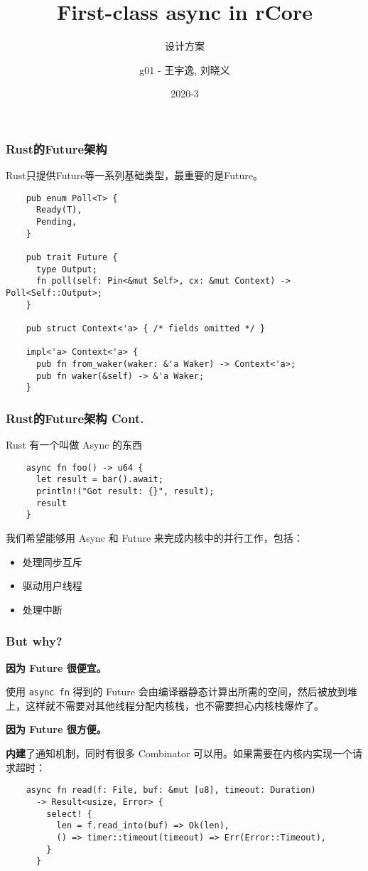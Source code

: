 \documentclass[UTF-8]{ctexbeamer}
\title{First-class async in rCore}
\subtitle{设计方案}
\author{g01 - 王宇逸, 刘晓义}
\date{2020-3}
\begin{document}
\begin{frame}
  \titlepage
\end{frame}

\begin{frame}[fragile]
  \frametitle{Rust的Future架构}

  Rust只提供Future等一系列基础类型，最重要的是Future。
  {
  \scriptsize
  \begin{verbatim}
    pub enum Poll<T> {
      Ready(T),
      Pending,
    }

    pub trait Future {
      type Output;
      fn poll(self: Pin<&mut Self>, cx: &mut Context) -> Poll<Self::Output>;
    }

    pub struct Context<'a> { /* fields omitted */ }

    impl<'a> Context<'a> {
      pub fn from_waker(waker: &'a Waker) -> Context<'a>;
      pub fn waker(&self) -> &'a Waker;
    }
  \end{verbatim}
  }
\end{frame}

\begin{frame}[fragile]
  \frametitle{Rust的Future架构 Cont.}

  Rust 有一个叫做 Async 的东西

  \begin{verbatim}
    async fn foo() -> u64 {
      let result = bar().await;
      println!("Got result: {}", result);
      result
    }
  \end{verbatim}

  \vspace{1em}

  我们希望能够用 Async 和 Future 来完成内核中的并行工作，包括：
  \begin{itemize}
    \item 处理同步互斥
    \item 驱动用户线程
    \item 处理中断
  \end{itemize}
\end{frame}

\begin{frame}[fragile]
  \frametitle{But why?}

  \textbf{因为 Future 很便宜。}

  使用 \texttt{async fn} 得到的 Future 会由编译器静态计算出所需的空间，然后被放到堆上，这样就不需要对其他线程分配内核栈，也不需要担心内核栈爆炸了。

  \vspace{1em}

  \textbf{因为 Future 很方便。}

  \textbf{内建}了通知机制，同时有很多 Combinator 可以用。如果需要在内核内实现一个请求超时：

  {
  \scriptsize
  \begin{verbatim}
    async fn read(f: File, buf: &mut [u8], timeout: Duration)
      -> Result<usize, Error> {
        select! {
          len = f.read_into(buf) => Ok(len),
          () => timer::timeout(timeout) => Err(Error::Timeout),
        }
      }
  \end{verbatim}
  }
\end{frame}
\end{document}
